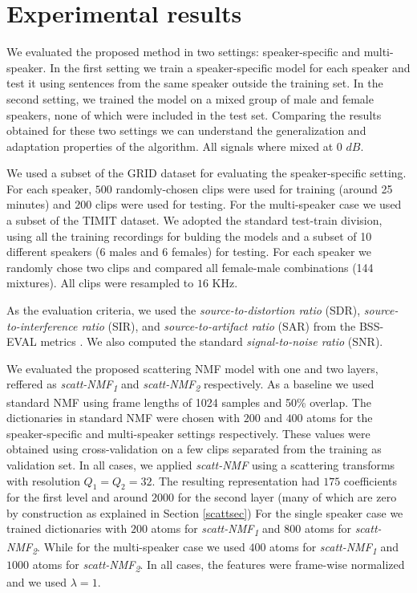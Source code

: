\section{Experimental results}
\label{sec:experiments}


 We evaluated the proposed method in two settings: speaker-specific and multi-speaker. In the first setting 
we train a speaker-specific model for each speaker and test it using sentences from the same speaker outside the training set. 
In the second setting, we trained the model on a mixed group of male and female speakers, none of which were included in the test set.
Comparing the results obtained for these two settings we can understand the generalization and adaptation properties of the algorithm. 
All signals where mixed at 0 $dB$.

 We used a subset of the GRID dataset \cite{cooke2006audio} for evaluating the speaker-specific setting.
For each speaker, $500$ randomly-chosen clips were used for training (around 25 minutes) and $200$ clips were used for testing.
For the multi-speaker case we used a subset of the TIMIT dataset. We adopted the standard test-train division, using all the training recordings for bulding the models
and a subset of 10 different speakers (6 males and 6 females) for testing. For each speaker we randomly chose two clips and compared
all female-male combinations (144 mixtures). All clips were resampled to $16$ KHz. 

 As the evaluation criteria, we used the \emph{source-to-distortion ratio} (SDR), \emph{source-to-interference ratio} (SIR), and
\emph{source-to-artifact ratio} (SAR) from the BSS-EVAL metrics \cite{vincent2006performance}. 
%
We also computed the standard \emph{signal-to-noise ratio} (SNR).
%

 We evaluated the proposed scattering NMF model with one and two layers, reffered
as \emph{scatt-NMF\textsubscript{1}} and \emph{scatt-NMF\textsubscript{2}} respectively. As a baseline we used standard NMF 
using frame lengths of 1024 samples and 50\% overlap. 
%
The dictionaries in standard NMF were chosen with $200$ and $400$ atoms for the speaker-specific and multi-speaker
settings respectively. These values were obtained using cross-validation on a few clips separated from the training as validation set.
%
In all cases, we applied \emph{scatt-NMF} using a scattering transforms with resolution $Q_1= Q_2 = 32$.
The resulting representation had $175$ coefficients for the first level and around $2000$ for the second layer (many of which are
zero by construction as explained in Section \ref{scattsec})
%
For the single speaker case we trained dictionaries with $200$ atoms for \emph{scatt-NMF\textsubscript{1}}  and $800$ atoms for \emph{scatt-NMF\textsubscript{2}}.
While for the multi-speaker case we used $400$ atoms for \emph{scatt-NMF\textsubscript{1}}  and $1000$ atoms for \emph{scatt-NMF\textsubscript{2}}.
In all cases, the features were frame-wise normalized and we used $\lambda=1$. 


